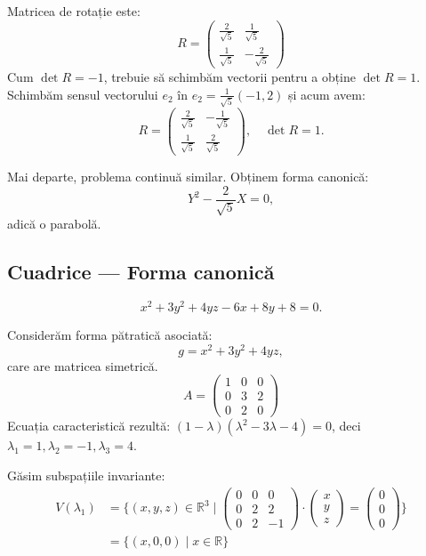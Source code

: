 \documentclass[11pt,a4paper]{article}
\newcommand\RR{\mathbb{R}}
\theoremstyle{dotless}
\theoremstyle{dotlessdr}
\begin{document}
Matricea de rotație este:
\[
  R = \begin{pmatrix}
    \frac{2}{\sqrt{5}} & \frac{1}{\sqrt{5}} \\
    \frac{1}{\sqrt{5}} & -\frac{2}{\sqrt{5}}
  \end{pmatrix}
\]
{\color{red}
Cum $\det R = -1$, trebuie să schimbăm vectorii pentru a obține $\det R = 1$.
Schimbăm sensul vectorului $e_2$ în $e_2 = \frac{1}{\sqrt{5}} (-1, 2)$ și acum avem:
\[
  R = \begin{pmatrix}
    \frac{2}{\sqrt{5}} & -\frac{1}{\sqrt{5}} \\
    \frac{1}{\sqrt{5}} & \frac{2}{\sqrt{5}}
  \end{pmatrix}, \quad \det R = 1.
\]}

Mai departe, problema continuă similar. Obținem forma canonică:
\[
  Y^2 - \frac{2}{\sqrt{5}} X = 0,
\]
adică o parabolă.


\subsection{Cuadrice --- Forma canonică}
\label{sec:cuadrice-can}

\[
  x^2 + 3y^2 + 4yz - 6x + 8y + 8 = 0.
\]

Considerăm forma pătratică asociată:
\[
  g = x^2 + 3y^2 + 4yz,
\]
care are matricea simetrică.
\[
  A = \begin{pmatrix}
    1 & 0 & 0 \\
    0 & 3 & 2 \\
    0 & 2 & 0
  \end{pmatrix}
\]
Ecuația caracteristică rezultă: $(1 - \lambda)(\lambda^2 - 3\lambda - 4) = 0$,
deci $\lambda_1 = 1, \lambda_2 = -1, \lambda_3 = 4$.

Găsim subspațiile invariante:
\begin{align*}
  V(\lambda_1) &= \Bigg\{ (x, y, z) \in \RR^3 \mid %
                 \begin{pmatrix}
                   0 & 0 & 0 \\
                   0 & 2 & 2 \\
                   0 & 2 & -1
                 \end{pmatrix} \cdot
                           \begin{pmatrix}
                             x \\ y \\ z
                           \end{pmatrix}  =
  \begin{pmatrix}
    0 \\ 0 \\ 0
  \end{pmatrix} \Bigg\} \\
               &= \{ (x, 0, 0) \mid x \in \RR \}
\end{align*}
\end{document}

